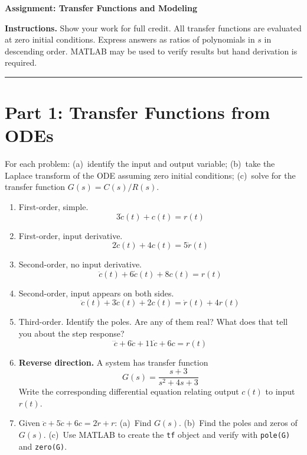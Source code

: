 \documentclass[11pt]{article}
\begin{document}
\begin{center}
  \Large{\bf{Assignment: Transfer Functions and Modeling}}
\end{center}

\textbf{Instructions.}  Show your work for full credit.  All transfer functions
are evaluated at zero initial conditions.  Express answers as ratios of
polynomials in $s$ in descending order.  MATLAB may be used to verify results
but hand derivation is required.

\bigskip\hrule\bigskip

\section*{Part 1: Transfer Functions from ODEs}

For each problem: (a)~identify the input and output variable; (b)~take the
Laplace transform of the ODE assuming zero initial conditions; (c)~solve for
the transfer function $G(s) = C(s)/R(s)$.

\begin{enumerate}[label=\textbf{\arabic*.}]

\item First-order, simple.
\[
  3\dot{c}(t) + c(t) = r(t)
\]

\item First-order, input derivative.
\[
  2\dot{c}(t) + 4c(t) = 5\dot{r}(t)
\]

\item Second-order, no input derivative.
\[
  \ddot{c}(t) + 6\dot{c}(t) + 8c(t) = r(t)
\]

\item Second-order, input appears on both sides.
\[
  \ddot{c}(t) + 3\dot{c}(t) + 2c(t) = \dot{r}(t) + 4r(t)
\]

\item Third-order.  Identify the poles.  Are any of them real?  What does that
  tell you about the step response?
\[
  \dddot{c} + 6\ddot{c} + 11\dot{c} + 6c = r(t)
\]

\item \textbf{Reverse direction.}  A system has transfer function
\[
  G(s) = \frac{s + 3}{s^2 + 4s + 3}
\]
Write the corresponding differential equation relating output $c(t)$ to input
$r(t)$.

\item Given $\ddot{c} + 5\dot{c} + 6c = 2\dot{r} + r$:
(a)~Find $G(s)$.
(b)~Find the poles and zeros of $G(s)$.
(c)~Use MATLAB to create the \texttt{tf} object and verify with \texttt{pole(G)}
and \texttt{zero(G)}.

\end{enumerate}
\end{document}
